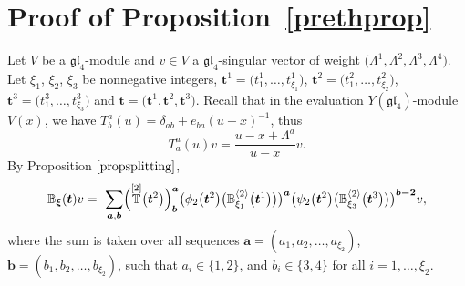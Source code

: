 \documentclass[pdftex]{sigma}
\numberwithin{equation}{section}
\newcommand\ltwo{\langle 2\rangle}
\begin{document}
\section{Proof of Proposition~\ref{prethprop}}\label{section5}
Let $V$ be a $\mathfrak{gl}_4$-module and $v\in V$ a $\mathfrak{gl}_4$-singular vector of weight $\bigl(\Lambda^1,\Lambda^2,\Lambda^3,\Lambda^4\bigr)$. Let $\xi_1$, $\xi_2$, $\xi_3$ be nonnegative integers, $\boldsymbol{t}^1=\bigl(t^1_1,\dots,t^1_{\xi_1}\bigr)$, $\boldsymbol{t}^2=\bigl(t^2_1,\dots,t^2_{\xi_2}\bigr)$, $\boldsymbol{t}^3=\bigl(t^3_1,\dots,t^3_{\xi_3}\bigr)$ and $\boldsymbol{t}=\bigl(\boldsymbol{t}^1,\boldsymbol{t}^2,\boldsymbol{t}^3\bigr)$.
Recall that in the evaluation $Y(\mathfrak{gl}_4)$-module $V(x)$, we have $T^a_b(u)=\delta_{ab}+ e_{ba}(u-x)^{-1}$, thus
\begin{equation*}T^a_a(u)v=\frac{u-x+\Lambda^a}{u-x} v.\end{equation*}
By Proposition $\ref{propsplitting}$,
\begin{equation}\label{step1}
{\mathbb{B}}_{\boldsymbol{\xi}}(\boldsymbol{t})v =\
\sum_{\boldsymbol{a},\boldsymbol{b}} \Bigl( \overset{[2]}{\mathbb{T}} \bigl(\boldsymbol{t}^{2}\bigr)\Bigr)^{\boldsymbol{a}}_{\boldsymbol{b}} \bigl(\phi_2\bigl(\boldsymbol{t}^ 2\bigr)\bigl(\mathbb{B}_{\xi_1}^{\ltwo}\bigl(\boldsymbol{t}^{1}\bigr)\bigr)\bigr)^{\boldsymbol{a}} \bigl(\psi_2\bigl(\boldsymbol{t}^{2}\bigr)\bigl(\mathbb{B}_{\xi_3}^{\ltwo}\bigl(\boldsymbol{t}^{ 3}\bigr)\bigr)\bigr)^{\boldsymbol{b-2}} v,
\end{equation}
where the sum is taken over all sequences $\boldsymbol{a}=(a_1,a_2,\dots,a_{\xi_2})$, $\boldsymbol{b}=(b_1,b_2,\dots,b_{\xi_2})$, such that $a_i\in \{1,2\}$, and $b_i\in \{3,4\}$ for all $i=1,\dots,\xi_2$.
\end{document}
